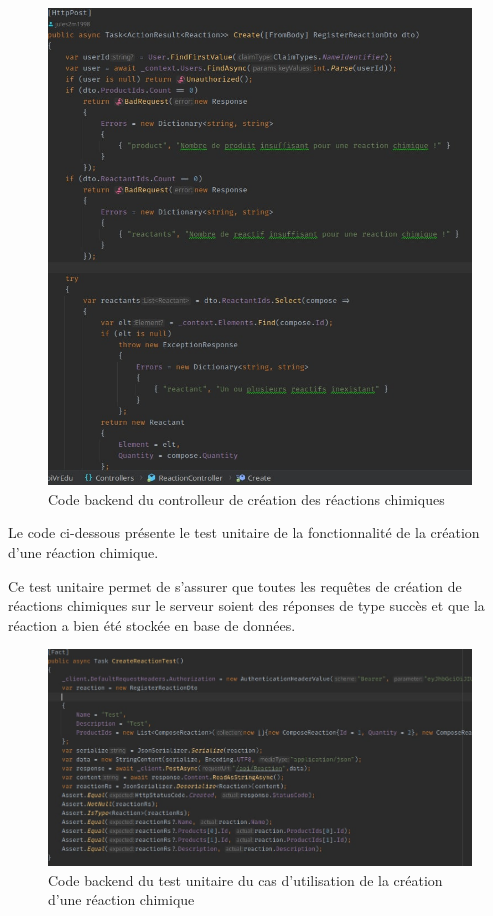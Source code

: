 \begin{figure}[H]
	\centering
	\includegraphics[width=1\textwidth]{img/crec}
	\caption{Code backend du controlleur de création des réactions chimiques}
\end{figure}

Le code ci-dessous présente le test unitaire de la fonctionnalité de la création d'une réaction chimique.

Ce test unitaire permet de s'assurer que toutes les requêtes de création de réactions chimiques sur le serveur soient des réponses de type succès et que la réaction a bien été stockée en base de données.

\begin{figure}[H]
	\centering
	\includegraphics[width=1\textwidth]{img/creac}
	\caption{Code backend du test unitaire du cas d'utilisation de la création d'une réaction chimique}
\end{figure}

